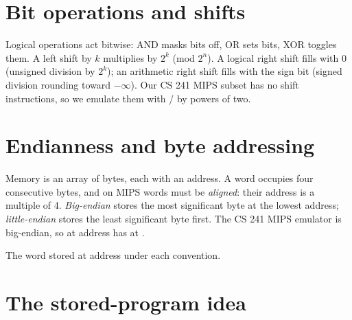 \section{Bit operations and shifts}

Logical operations act bitwise: AND masks bits off, OR sets bits, XOR toggles them.
A left shift by $k$ multiplies by $2^k$ (mod $2^n$). A logical right shift fills with 0
(unsigned division by $2^k$); an arithmetic right shift fills with the sign bit (signed
division rounding toward $-\infty$). Our CS 241 MIPS subset has no shift instructions, so we
emulate them with / by powers of two.

\section{Endianness and byte addressing}

Memory is an array of bytes, each with an address. A word occupies four consecutive bytes,
and on MIPS words must be \emph{aligned}: their address is a multiple of 4.
\emph{Big-endian} stores the most significant byte at the lowest address; \emph{little-endian}
stores the least significant byte first. The CS 241 MIPS emulator is big-endian, so
 at address  has  at .

\begin{center}

\small The word  stored at address  under each convention.
\end{center}

\section{The stored-program idea}

